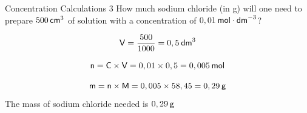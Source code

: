       \begin{wex}{Concentration Calculations 3 }
{
\label{m38712*id283476}How much sodium chloride (in g) will one need to prepare $500\phantom{\rule{2pt}{0ex}}{\mathsf{cm}}^{3}$ of solution with a concentration of $0,01\phantom{\rule{2pt}{0ex}}\mathsf{mol}\cdot \mathsf{dm}^{-3}$?
      \vspace{5pt} }
{
    \begin{equation*}
    \mathsf{V}=\frac{500}{1 000}=0,5\phantom{\rule{2pt}{0ex}}{\mathsf{dm}}^{3}
      \end{equation*}
      \label{m38712*id283565}\nopagebreak\noindent{}
        
    \begin{equation*}
    \mathsf{n}=\mathsf{C}\ensuremath{\times}\mathsf{V}=0,01\ensuremath{\times}0,5=0,005\phantom{\rule{2pt}{0ex}}\mathsf{mol}
      \end{equation*}
      \label{m38712*id283636}\nopagebreak\noindent{}
        
    \begin{equation*}
    \mathsf{m}=\mathsf{n}\ensuremath{\times}\mathsf{M}=0,005\ensuremath{\times}58,45=0,29\phantom{\rule{2pt}{0ex}}\mathsf{g}
      \end{equation*}
      \label{m38712*id283684}The mass of sodium chloride needed is $0,29\phantom{\rule{2pt}{0ex}}\mathsf{g}$
 
}
    \end{wex}
    \noindent
\label{m38712*secfhsst!!!underscore!!!id1879}
